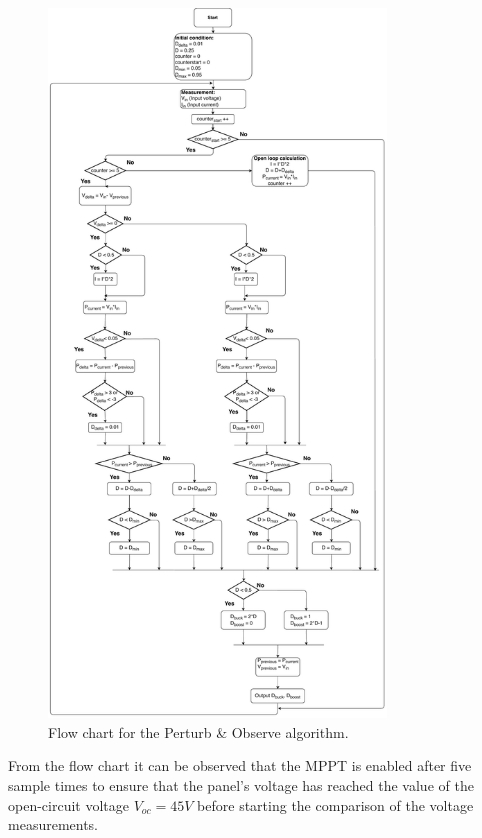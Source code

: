 \begin{figure}[H]
	\begin{center}
		\includegraphics[width=0.8\textwidth]{../Pictures/P1/Flow_chart/2018_11_15_Flow_chart_MPPT_Buck-Boost_converter}
		\caption{Flow chart for the Perturb \& Observe algorithm.}
		\label{fcfinal} 
	\end{center}	
\end{figure}
From the flow chart it can be observed that the MPPT is enabled after five sample times to ensure that the panel's voltage has reached the value of the open-circuit voltage $V_{oc}=45 V$ before starting the comparison of the voltage measurements.
